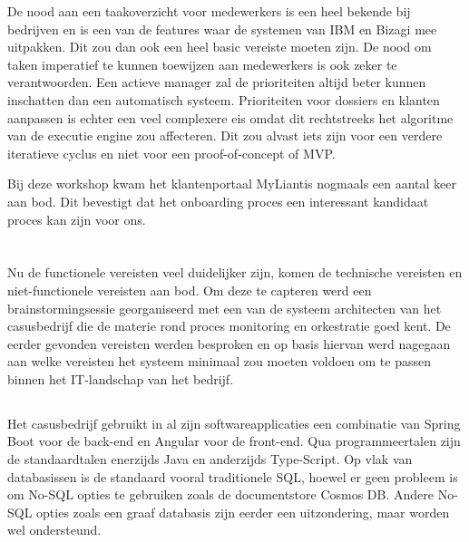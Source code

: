 De nood aan een taakoverzicht voor medewerkers is een heel bekende bij bedrijven en is een van de features waar de systemen van IBM en Bizagi mee uitpakken. Dit zou dan ook een heel basic vereiste moeten zijn. De nood om taken imperatief te kunnen toewijzen aan medewerkers is ook zeker te verantwoorden. Een actieve manager zal de prioriteiten altijd beter kunnen inschatten dan een automatisch systeem. Prioriteiten voor dossiers en klanten aanpassen is echter een veel complexere eis omdat dit rechtstreeks het algoritme van de executie engine zou affecteren. Dit zou alvast iets zijn voor een verdere iteratieve cyclus en niet voor een proof-of-concept of MVP. \newline

Bij deze workshop kwam het klantenportaal MyLiantis nogmaals een aantal keer aan bod. Dit bevestigt dat het onboarding proces een interessant kandidaat proces kan zijn voor ons.

\section{}%
\label{sec:technische vereisten}
\subsection{}%
\label{subsec:opzet tech}
Nu de functionele vereisten veel duidelijker zijn, komen de technische vereisten en niet-functionele vereisten aan bod. Om deze te capteren werd een brainstormingsessie georganiseerd met een van de systeem architecten van het casusbedrijf die de materie rond proces monitoring en orkestratie goed kent. De eerder gevonden vereisten werden besproken en op basis hiervan werd nagegaan aan welke vereisten het systeem minimaal zou moeten voldoen om te passen binnen het IT-landschap van het bedrijf.
\subsection{}%
\label{subsec:brainstorming sessie met systeem architect}
Het casusbedrijf gebruikt in al zijn softwareapplicaties een combinatie van Spring Boot voor de back-end en Angular voor de front-end. Qua programmeertalen zijn de standaardtalen enerzijds Java en anderzijds Type-Script. Op vlak van databasissen is de standaard vooral traditionele SQL, hoewel er geen probleem is om No-SQL opties te gebruiken zoals de documentstore Cosmos DB. Andere No-SQL opties zoals een graaf databasis zijn eerder een uitzondering, maar worden wel ondersteund. \newline

